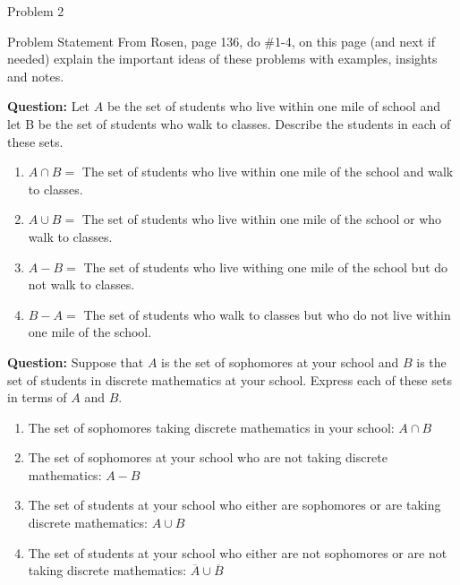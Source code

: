 \begin{problem}{Problem 2}
    \begin{statement}{Problem Statement}
        From Rosen, page 136, do \#1-4, on this page (and next if needed) explain the important ideas of these problems with examples, insights and notes.
    \end{statement}

    \begin{Highlight}[Solution - \#1]
        \noindent \textbf{Question:} Let $A$ be the set of students who live within one mile of school and let B be the set of students who walk to classes. Describe the students in each of these sets.
        
        \begin{enumerate}[label=(\alph*)]
            \item $A \cap B =$ The set of students who live within one mile of the school and walk to classes. 
            \item $A \cup B =$ The set of students who live within one mile of the school or who walk to classes.
            \item $A - B =$ The set of students who live withing one mile of the school but do not walk to classes.
            \item $B - A =$ The set of students who walk to classes but who do not live within one mile of the school.
        \end{enumerate}
    \end{Highlight}

    \begin{Highlight}[Solution - \#2]
        \noindent \textbf{Question:} Suppose that $A$ is the set of sophomores at your school and $B$ is the set of students in discrete mathematics at your school. Express each of these sets in terms 
        of $A$ and $B$.

        \begin{enumerate}[label=(\alph*)]
            \item The set of sophomores taking discrete mathematics in your school: $A \cap B$
            \item The set of sophomores at your school who are not taking discrete mathematics: $A - B$
            \item The set of students at your school who either are sophomores or are taking discrete mathematics: $A \cup B$
            \item The set of students at your school who either are not sophomores or are not taking discrete mathematics: $\overline{A} \cup \overline{B}$
        \end{enumerate}
    \end{Highlight}


\end{problem}
